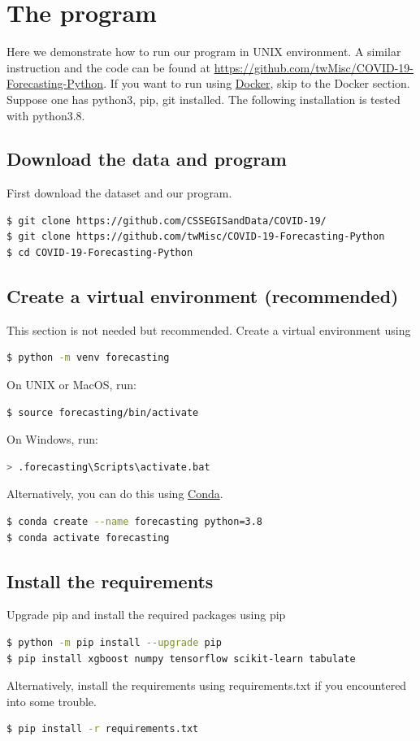 \documentclass[a4paper,12pt]{article}
\begin{document}
\section{The program}
Here we demonstrate how to run our program in UNIX environment. A similar instruction and the code can be found at \href{https://github.com/twMisc/COVID-19-Forecasting-Python}{https://github.com/twMisc/COVID-19-Forecasting-Python}. If you want to run using \href{https://www.docker.com/}{Docker}, skip to the Docker section. Suppose one has python3, pip, git installed. The following installation is tested with python3.8. 
\subsection{Download the data and program}
First download the dataset and our program. 
\lstset{style=mystyle}
\begin{lstlisting}[language=bash]
$ git clone https://github.com/CSSEGISandData/COVID-19/
$ git clone https://github.com/twMisc/COVID-19-Forecasting-Python
$ cd COVID-19-Forecasting-Python
\end{lstlisting}

\subsection{Create a virtual environment (recommended)}
This section is not needed but recommended. Create a virtual environment using
\begin{lstlisting}[language=bash]
$ python -m venv forecasting
\end{lstlisting}
On UNIX or MacOS, run:
\begin{lstlisting}[language=bash]
$ source forecasting/bin/activate
\end{lstlisting}
On Windows, run:
\begin{lstlisting}[language=bash]
> .forecasting\Scripts\activate.bat
\end{lstlisting}
Alternatively, you can do this using \href{https://docs.conda.io/projects/conda/en/latest/user-guide/tasks/manage-environments.html}{Conda}.
\begin{lstlisting}[language=bash]
$ conda create --name forecasting python=3.8
$ conda activate forecasting    
\end{lstlisting}

\subsection{Install the requirements}
Upgrade pip and install the required packages using pip
\begin{lstlisting}[language=bash]
$ python -m pip install --upgrade pip
$ pip install xgboost numpy tensorflow scikit-learn tabulate
 \end{lstlisting}
Alternatively, install the requirements using requirements.txt if you encountered into some trouble.
\begin{lstlisting}[language=bash]
$ pip install -r requirements.txt    
\end{lstlisting}
\end{document}

